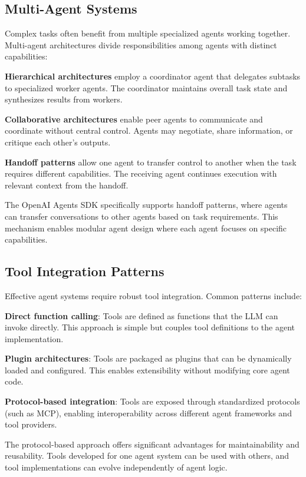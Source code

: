 \subsection{Multi-Agent Systems}

Complex tasks often benefit from multiple specialized agents working together. Multi-agent architectures divide responsibilities among agents with distinct capabilities:

\textbf{Hierarchical architectures} employ a coordinator agent that delegates subtasks to specialized worker agents. The coordinator maintains overall task state and synthesizes results from workers.

\textbf{Collaborative architectures} enable peer agents to communicate and coordinate without central control. Agents may negotiate, share information, or critique each other's outputs.

\textbf{Handoff patterns} allow one agent to transfer control to another when the task requires different capabilities. The receiving agent continues execution with relevant context from the handoff.

The OpenAI Agents SDK specifically supports handoff patterns, where agents can transfer conversations to other agents based on task requirements. This mechanism enables modular agent design where each agent focuses on specific capabilities.

\subsection{Tool Integration Patterns}

Effective agent systems require robust tool integration. Common patterns include:

\textbf{Direct function calling}: Tools are defined as functions that the LLM can invoke directly. This approach is simple but couples tool definitions to the agent implementation.

\textbf{Plugin architectures}: Tools are packaged as plugins that can be dynamically loaded and configured. This enables extensibility without modifying core agent code.

\textbf{Protocol-based integration}: Tools are exposed through standardized protocols (such as MCP), enabling interoperability across different agent frameworks and tool providers.

The protocol-based approach offers significant advantages for maintainability and reusability. Tools developed for one agent system can be used with others, and tool implementations can evolve independently of agent logic.

